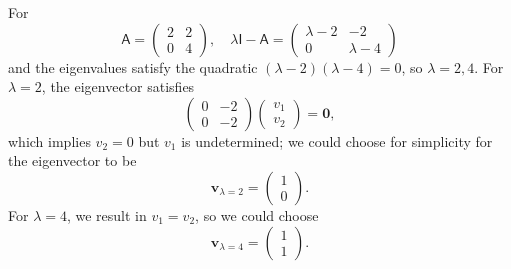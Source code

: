 \documentclass[letter-paper]{tufte-book}
\newenvironment{example}[1][Example]{\begin{trivlist}
\item[\hskip \labelsep {\bfseries #1}]}{\end{trivlist}}
\begin{document}
\begin{example}
  For
  \begin{equation*}
    \mathsf{A} = \begin{pmatrix}2 & 2 \\ 0 & 4\end{pmatrix}, \quad \lambda\mathsf{I} - \mathsf{A} = \begin{pmatrix}\lambda - 2 & -2 \\ 0 & \lambda - 4\end{pmatrix}
  \end{equation*}
  and the eigenvalues satisfy the quadratic
  $(\lambda-2)(\lambda-4) = 0$, so $\lambda=2, 4$. For $\lambda=2$, the
  eigenvector satisfies
  \begin{equation*}
    \begin{pmatrix}0 & -2 \\ 0 & -2\end{pmatrix}\begin{pmatrix}v_1 \\ v_2 \end{pmatrix} = \boldsymbol{0},
  \end{equation*}
  which implies $v_2 = 0$ but $v_1$ is undetermined; we could choose for
  simplicity for the eigenvector to be
  \begin{equation*}
   \boldsymbol{v}_{\lambda=2} = \begin{pmatrix}1 \\ 0 \end{pmatrix}.
  \end{equation*}
  For $\lambda = 4$, we result in $v_1 = v_2$, so we could choose
  \begin{equation*}
   \boldsymbol{v}_{\lambda=4} = \begin{pmatrix}1 \\ 1 \end{pmatrix}.
  \end{equation*}
\end{example}
\end{document}
